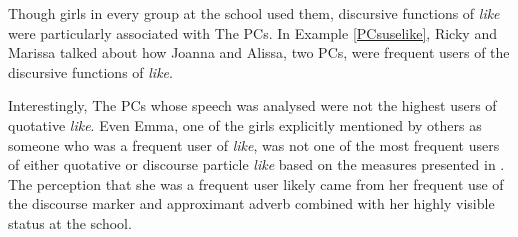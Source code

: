 \label{momdoesnotlikelike}
\vspace{5 mm}


\noindent Though girls in every group at the school used them, discursive functions of \textit{like} were particularly associated with The PCs.  In Example \ref{PCsuselike}, Ricky and Marissa talked about how Joanna and Alissa, two PCs, were frequent users of the discursive functions of \textit{like}.

\label{PCsuselike}
\vspace{5 mm}


\noindent Interestingly, The PCs whose speech was analysed were not the highest users of quotative \textit{like}. Even Emma, one of the girls explicitly mentioned by others as someone who was a frequent user of \textit{like}, was not one of the most frequent users of either quotative or discourse particle \textit{like} based on the measures presented in . The perception that she was a frequent user likely came from her frequent use of the discourse marker and approximant adverb combined with her highly visible status at the school. 

